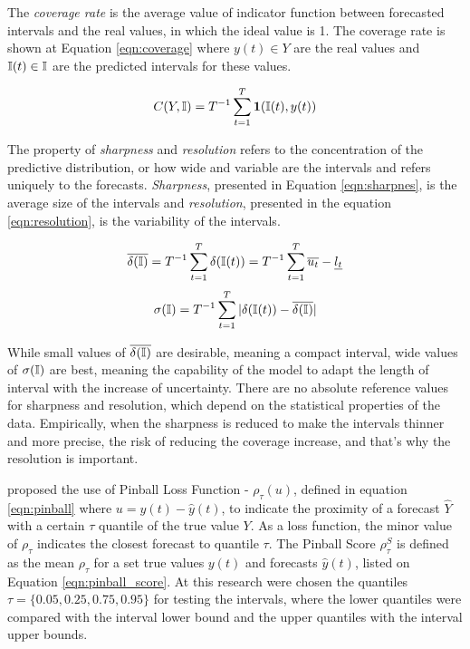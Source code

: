 
The \textit{coverage rate} is the average value of indicator function between forecasted intervals and the real values, in which the ideal value is 1. The coverage rate is shown at Equation \eqref{eqn:coverage} where $y(t) \in Y$ are the real values and $\mathbb{I}(t) \in \mathbb{I}$ are the predicted intervals for these values.

\begin{equation}
C(Y,\mathbb{I}) = T^{-1}\sum_{t = 1 }^T \mathbf{1}(\mathbb{I}(t),y(t))
\label{eqn:coverage}
\end{equation}


The property of \textit{sharpness} and \textit{resolution} refers to the concentration of the predictive distribution, or how wide and variable are the intervals and refers uniquely to the forecasts. \textit{Sharpness}, presented in Equation \eqref{eqn:sharpnes}, is the average size of the intervals and \textit{resolution}, presented in the equation \eqref{eqn:resolution}, is the variability of the intervals.   

\begin{equation}
\overline{\delta(\mathbb{I})} = T^{-1}\sum_{t=1}^{T} \delta(\mathbb{I}(t)) =  T^{-1}\sum_{t=1}^T \overline{u_t} - \underline{l_t}
\label{eqn:sharpnes}
\end{equation}
\begin{equation}
\sigma(\mathbb{I}) = T^{-1}\sum_{t=1}^T | \delta(\mathbb{I}(t)) - \overline{\delta(\mathbb{I})}|
\label{eqn:resolution}
\end{equation}

While small values of $\overline{\delta(\mathbb{I})}$ are desirable, meaning a compact interval, wide values of $\sigma(\mathbb{I})$ are best, meaning the capability of the model to adapt the length of interval with the increase of uncertainty. There are no absolute reference values for sharpness and resolution, which depend on the statistical properties of the data. Empirically, when the sharpness is reduced to make the intervals thinner and more precise, the risk of reducing the coverage increase, and that's why the resolution is important. 


\cite{Steinwart2011} proposed the use of Pinball Loss Function - $\rho_\tau(u)$, defined in equation \ref{eqn:pinball} where $u = y(t) - \hat{y}(t)$, to indicate the proximity of a forecast $\hat{Y}$ with a certain $\tau$ quantile of the true value $Y$. As a loss function, the minor value of $\rho_\tau$ indicates the closest forecast to quantile $\tau$. The Pinball Score $\rho_\tau^S$ is defined as the mean $\rho_\tau$ for a set true values $y(t)$ and forecasts $\hat{y}(t)$, listed on Equation \ref{eqn:pinball_score}. At this research were chosen the quantiles $\tau = \{0.05, 0.25, 0.75, 0.95\}$ for testing the intervals, where the lower quantiles were compared with the interval lower bound and the upper quantiles with the interval upper bounds.

